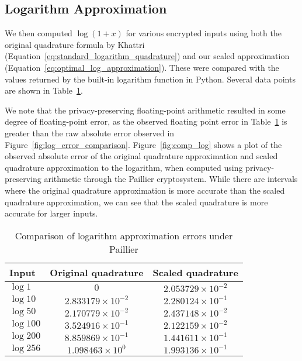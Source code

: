\subsection{Logarithm Approximation}
We then computed $\log\left(1+x\right)$ for various encrypted inputs using both the original quadrature formula by Khattri (Equation~\ref{eq:standard_logarithm_quadrature}) and our scaled approximation (Equation~\ref{eq:optimal_log_approximation}). These were compared with the values returned by the built-in logarithm function in Python. Several data points are shown in Table~\ref{tab:log_approximation}.

We note that the privacy-preserving floating-point arithmetic resulted in some degree of floating-point error, as the observed floating point error in Table~\ref{tab:log_approximation} is greater than the raw absolute error observed in Figure~\ref{fig:log_error_comparison}. Figure~\ref{fig:comp_log} shows a plot of the observed absolute error of the original quadrature approximation and scaled quadrature approximation to the logarithm, when computed using privacy-preserving arithmetic through the Paillier cryptosystem. While there are intervals where the original quadrature approximation is more accurate than the scaled quadrature approximation, we can see that the scaled quadrature is more accurate for larger inputs.

\begin{table}[ht]
	\caption{Comparison of logarithm approximation errors under Paillier}
	\label{tab:log_approximation}
	\begin{tabular}{lcc}
		\toprule
		Input & Original quadrature & Scaled quadrature\\
		\midrule
		$\log 1$ & $0$ & $2.053729 \times 10^{-2}$\\
		$\log 10$ & $2.833179 \times 10^{-2} $ & $2.280124 \times 10^{-1}$\\
		$\log 50$ & $2.170779 \times 10^{-2}$ & $2.437148 \times 10^{-2}$\\
		$\log 100$ & $3.524916 \times 10^{-1}$ & $2.122159 \times 10^{-2}$\\
		$\log 200$ & $8.859869 \times 10^{-1}$ & $1.441611 \times 10^{-1}$\\
		$\log 256$ & $1.098463 \times 10^{0}$ & $1.993136 \times 10^{-1}$\\
	\bottomrule
\end{tabular}
\end{table}

